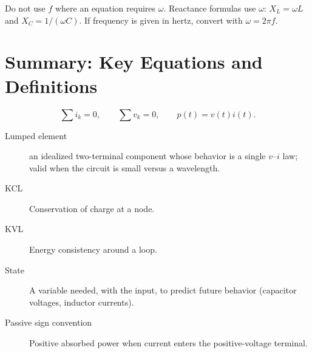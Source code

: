\begin{mistakebox}
Do not use \(f\) where an equation requires \(\omega\). Reactance formulas use
\(\omega\): \(X_L=\omega L\) and \(X_C=1/(\omega C)\). If frequency is given in
hertz, convert with \(\omega=2\pi f\).
\end{mistakebox}

\section{Summary: Key Equations and Definitions}
\[
\sum i_k=0,\qquad \sum v_k=0,\qquad
p(t)=v(t)i(t).
\]

\medskip
\begin{description}
\item[Lumped element] an idealized two-terminal component whose behavior is a
single \(v\)--\(i\) law; valid when the circuit is small versus a wavelength.
\item[KCL] Conservation of charge at a node.
\item[KVL] Energy consistency around a loop.
\item[State] A variable needed, with the input, to predict future behavior
(capacitor voltages, inductor currents).
\item[Passive sign convention] Positive absorbed power when current enters the
positive-voltage terminal.
\end{description}
